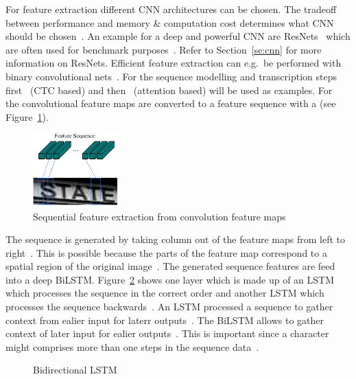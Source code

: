 For feature extraction different \ac{CNN} architectures can be chosen.
The tradeoff between performance and memory \& computation cost determines what \ac{CNN} should be
chosen~\citep{chen_text_2021}.
An example for a deep and powerful \ac{CNN} are ResNets~\citep{he_deep_2015} which are often used
for benchmark purposes~\citep{chen_text_2021,long_scene_2021}.
Refer to Section~\ref{se:cnn} for more information on ResNets.
Efficient feature extraction can e.g.\ be performed with binary convolutional
nets~\citep{liu_scut-ctw1500_2022}.
For the sequence modelling and transcription steps first~\cite{shi_end--end_2017} (\ac{CTC} based)
and then~\cite{ghosh_visual_2017} (attention based) will be used as examples.
For~\cite{shi_end--end_2017} the convolutional feature maps are converted to a feature sequence
with a (see Figure~\ref{fig:STR-CTC-seq-feat}).
\begin{figure}[h]
    \centering
    \includegraphics[width=0.3\textwidth]{img/STR-encdec-sequence-feat.png}
    \caption[Sequential feature extraction from convolution feature maps]{%
        Sequential feature extraction from convolution feature
        maps~\citep{shi_end--end_2017}\label{fig:STR-CTC-seq-feat}
    }
\end{figure}
The sequence is generated by taking column out of the feature maps from left to
right~\citep{shi_end--end_2017}.
This is possible because the parts of the feature map correspond to a spatial region of the
original image~\citep{shi_end--end_2017,goodfellow_deep_2016}.
The generated sequence features are feed into a deep \ac{BiLSTM}.
Figure~\ref{fig:bilstm} shows one layer which is made up of an \ac{LSTM} which processes the
sequence in the correct order and another \ac{LSTM} which processes the sequence
backwards~\citep{shi_end--end_2017}.
An \ac{LSTM} processed a sequence to gather context from ealier input for laterr
outputs~\citep{shi_end--end_2017,goodfellow_deep_2016}.
The \ac{BiLSTM} allows to gather context of later input for ealier outputs~\citep{shi_end--end_2017}.
This is important since a character might comprises more than one steps in the sequence
data~\citep{shi_end--end_2017}.
\begin{figure}[ht]
    \centering
    \caption[Bidirectional LSTM]{%
        Bidirectional LSTM~\citep{goodfellow_deep_2016}\label{fig:bilstm}
    }
\end{figure}
